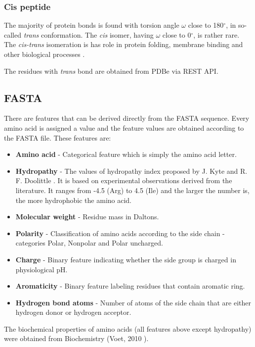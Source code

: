 \subsubsection{Cis peptide}

The majority of protein bonds is found with torsion angle $\omega$ close to 180$^\circ$, in so-called \textit{trans} conformation. The \textit{cis} isomer, having $\omega$ close to 0$^\circ$, is rather rare. The \textit{cis-trans} isomeration is has role in protein folding, membrane binding and other biological processes \cite{cispeptide}.

The residues with \textit{trans} bond are obtained from PDBe via REST API.


\subsection{FASTA}

There are features that can be derived directly from the FASTA sequence. Every amino acid is assigned a value and the feature values are obtained according to the FASTA file. These features are:

\begin{itemize}
\item \textbf{Amino acid} - Categorical feature which is simply the amino acid letter.
\item \textbf{Hydropathy} - The values of hydropathy index proposed by J. Kyte and R. F. Doolittle \cite{kyte}. It is based on experimental observations derived from the literature. It ranges from -4.5 (Arg) to 4.5 (Ile) and the larger the number is, the more hydrophobic the amino acid.
\item \textbf{Molecular weight} - Residue mass in Daltons.
\item \textbf{Polarity} - Classification of amino acids according to the side chain - categories Polar, Nonpolar and Polar uncharged.
\item \textbf{Charge} - Binary feature indicating whether the side group is charged in physiological pH.
\item \textbf{Aromaticity} - Binary feature labeling residues that contain aromatic ring.
\item \textbf{Hydrogen bond atoms} - Number of atoms of the side chain that are either hydrogen donor or hydrogen acceptor.
\end{itemize}

The biochemical properties of amino acids (all features above except hydropathy) were obtained from Biochemistry (Voet, 2010 \cite{voet}).

